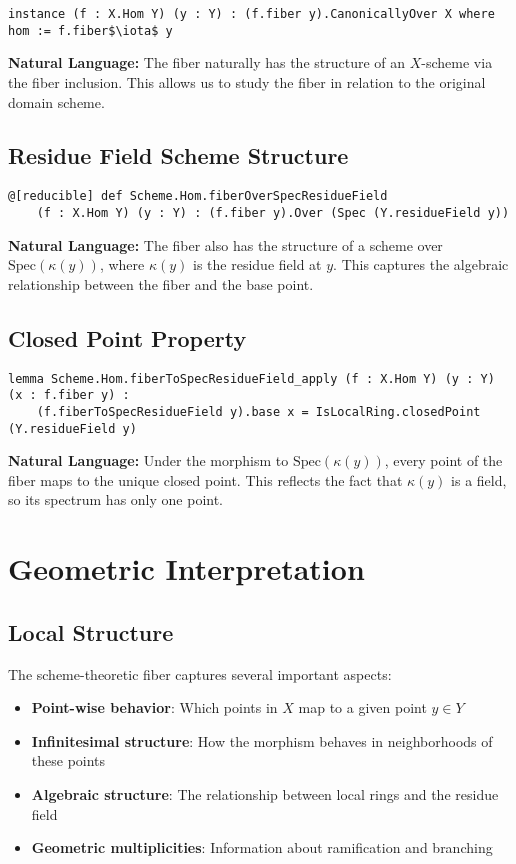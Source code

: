\documentclass{article}
\theoremstyle{definition}
\begin{document}
\begin{lstlisting}
instance (f : X.Hom Y) (y : Y) : (f.fiber y).CanonicallyOver X where hom := f.fiber$\iota$ y
\end{lstlisting}

\textbf{Natural Language:} The fiber naturally has the structure of an $X$-scheme via the fiber inclusion. This allows us to study the fiber in relation to the original domain scheme.

\subsection{Residue Field Scheme Structure}

\begin{lstlisting}
@[reducible] def Scheme.Hom.fiberOverSpecResidueField
    (f : X.Hom Y) (y : Y) : (f.fiber y).Over (Spec (Y.residueField y))
\end{lstlisting}

\textbf{Natural Language:} The fiber also has the structure of a scheme over $\mathrm{Spec}(\kappa(y))$, where $\kappa(y)$ is the residue field at $y$. This captures the algebraic relationship between the fiber and the base point.

\subsection{Closed Point Property}

\begin{lstlisting}
lemma Scheme.Hom.fiberToSpecResidueField_apply (f : X.Hom Y) (y : Y) (x : f.fiber y) :
    (f.fiberToSpecResidueField y).base x = IsLocalRing.closedPoint (Y.residueField y)
\end{lstlisting}

\textbf{Natural Language:} Under the morphism to $\mathrm{Spec}(\kappa(y))$, every point of the fiber maps to the unique closed point. This reflects the fact that $\kappa(y)$ is a field, so its spectrum has only one point.

\section{Geometric Interpretation}

\subsection{Local Structure}

The scheme-theoretic fiber captures several important aspects:
\begin{itemize}
\item \textbf{Point-wise behavior}: Which points in $X$ map to a given point $y \in Y$
\item \textbf{Infinitesimal structure}: How the morphism behaves in neighborhoods of these points
\item \textbf{Algebraic structure}: The relationship between local rings and the residue field
\item \textbf{Geometric multiplicities}: Information about ramification and branching
\end{itemize}
\end{document}
